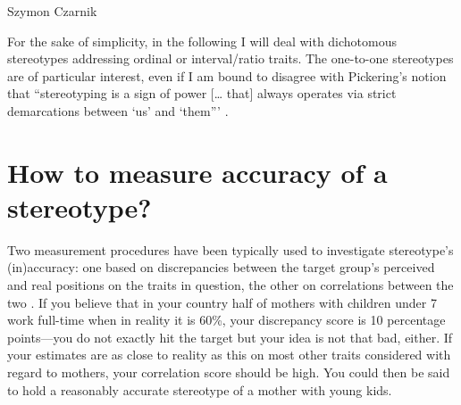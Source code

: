 \begin{artengenv}{Szymon Czarnik}
\begin{enumerate}
\end{enumerate}
For the sake of simplicity, in the following I will deal with dichotomous stereotypes addressing ordinal or interval/ratio traits. The one-to-one stereotypes are of particular interest, even if I am bound to disagree with Pickering's notion that ``stereotyping is a sign of power [… that] always operates via strict demarcations between ‘us' and ‘them'''
\parencite[][p.616]{pickering_stereotyping_2011}.%


\section{How to measure accuracy of a stereotype?}
Two measurement procedures have been typically used to investigate stereotype's (in)accuracy: one based on discrepancies between the target group's perceived and real positions on the traits in question, the other on correlations between the two
\parencite[][]{jussim_stereotype_2016}. %
 If you believe that in your country half of mothers with children under 7 work full-time when in reality it is 60\%, your discrepancy score is 10 percentage points—you do not exactly hit the target but your idea is not that bad, either. If your estimates are as close to reality as this on most other traits considered with regard to mothers, your correlation score should be high. You could then be said to hold a reasonably accurate stereotype of a mother with young kids.


\end{artengenv}
